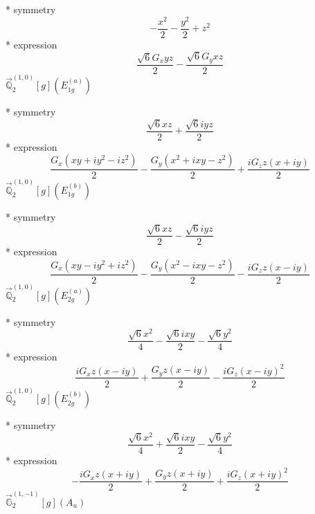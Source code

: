 \documentclass[fleqn,8pt]{jsarticle}
\begin{document}
\noindent\quad ** symmetry
\begin{dmath*}
- \frac{x^{2}}{2} - \frac{y^{2}}{2} + z^{2}
\end{dmath*}
\noindent\quad ** expression
\begin{dmath*}
\frac{\sqrt{6} G_{x} y z}{2} - \frac{\sqrt{6} G_{y} x z}{2}
\end{dmath*}
\noindent\quad $\vec{\mathbb{Q}}_{2}^{(1,0)}[g](E_{1g}^{(a)})$

\noindent\quad ** symmetry
\begin{dmath*}
\frac{\sqrt{6} x z}{2} + \frac{\sqrt{6} i y z}{2}
\end{dmath*}
\noindent\quad ** expression
\begin{dmath*}
\frac{G_{x} \left(x y + i y^{2} - i z^{2}\right)}{2} - \frac{G_{y} \left(x^{2} + i x y - z^{2}\right)}{2} + \frac{i G_{z} z \left(x + i y\right)}{2}
\end{dmath*}
\noindent\quad $\vec{\mathbb{Q}}_{2}^{(1,0)}[g](E_{1g}^{(b)})$

\noindent\quad ** symmetry
\begin{dmath*}
\frac{\sqrt{6} x z}{2} - \frac{\sqrt{6} i y z}{2}
\end{dmath*}
\noindent\quad ** expression
\begin{dmath*}
\frac{G_{x} \left(x y - i y^{2} + i z^{2}\right)}{2} - \frac{G_{y} \left(x^{2} - i x y - z^{2}\right)}{2} - \frac{i G_{z} z \left(x - i y\right)}{2}
\end{dmath*}
\noindent\quad $\vec{\mathbb{Q}}_{2}^{(1,0)}[g](E_{2g}^{(a)})$

\noindent\quad ** symmetry
\begin{dmath*}
\frac{\sqrt{6} x^{2}}{4} - \frac{\sqrt{6} i x y}{2} - \frac{\sqrt{6} y^{2}}{4}
\end{dmath*}
\noindent\quad ** expression
\begin{dmath*}
\frac{i G_{x} z \left(x - i y\right)}{2} + \frac{G_{y} z \left(x - i y\right)}{2} - \frac{i G_{z} \left(x - i y\right)^{2}}{2}
\end{dmath*}
\noindent\quad $\vec{\mathbb{Q}}_{2}^{(1,0)}[g](E_{2g}^{(b)})$

\noindent\quad ** symmetry
\begin{dmath*}
\frac{\sqrt{6} x^{2}}{4} + \frac{\sqrt{6} i x y}{2} - \frac{\sqrt{6} y^{2}}{4}
\end{dmath*}
\noindent\quad ** expression
\begin{dmath*}
- \frac{i G_{x} z \left(x + i y\right)}{2} + \frac{G_{y} z \left(x + i y\right)}{2} + \frac{i G_{z} \left(x + i y\right)^{2}}{2}
\end{dmath*}
\noindent\quad $\vec{\mathbb{G}}_{2}^{(1,-1)}[g](A_{u})$
\end{document}

